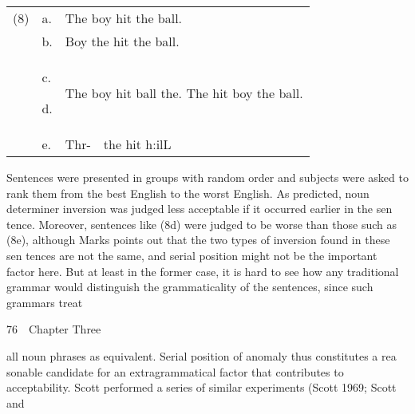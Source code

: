 \begin{flushleft}
\tablehead{}
\begin{supertabular}{m{0.20455986in}m{0.22685984in}m{1.1886599in}}
(8)

 &
a.

 &
The boy hit the ball.

\\
 &
b.

 &
Boy the hit the ball.

\\
 &
c.

d.

 &
The boy hit ball the. The hit boy the ball.

\\
 &
e.

 &
Thr-\ \ the hit h:ilL

\\
\end{supertabular}
\end{flushleft}
\begin{styleTextbody}
Sentences were presented in groups with random order and subjects were asked to rank them from the best English to the worst English. As predicted, noun\- determiner inversion was judged less acceptable if it occurred earlier in the sen\- tence. Moreover, sentences like (8d) were judged to be worse than those such as (8e), although Marks points out that the two types of inversion found in these sen\- tences are not the same, and serial position might not be the important factor here. But at least in the former case, it is hard to see how any traditional grammar would distinguish the grammaticality of the sentences, since such grammars treat
\end{styleTextbody}


\clearpage\setcounter{page}{1}\begin{styleStandard}
76\ \ Chapter Three
\end{styleStandard}


\begin{styleTextbody}
all noun phrases as equivalent. Serial position of anomaly thus constitutes a rea\- sonable candidate for an extragrammatical factor that contributes to acceptability. Scott performed a series of similar experiments (Scott 1969; Scott and
\end{styleTextbody}


